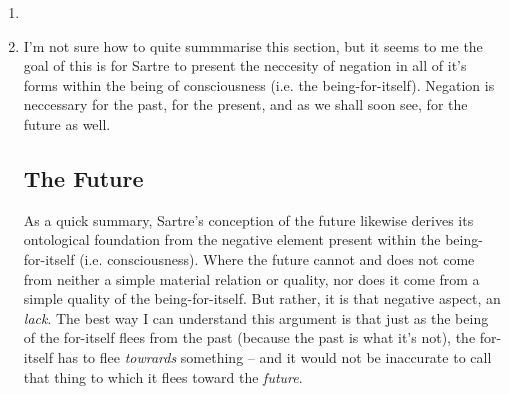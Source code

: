\begin{enumerate}
  \item {}
  \item I'm not sure how to quite summmarise this section, but it seems to me the goal of this is for Sartre to present the neccesity of negation in all of it's forms within the being of consciousness (i.e. the being-for-itself). Negation is neccessary for the past, for the present, and as we shall soon see, for the future as well.

  \subsection*{The Future}
  As a quick summary, Sartre's conception of the future likewise derives its ontological foundation from the negative element present within the being-for-itself (i.e. consciousness). Where the future cannot and does not come from neither a simple material relation or quality, nor does it come from a simple quality of the being-for-itself. But rather, it is that negative aspect, an \emph{lack}. The best way I can understand this argument is that just as the being of the for-itself flees from the past (because the past is what it's not), the for-itself has to flee \emph{towrards} something -- and it would not be inaccurate to call that thing to which it flees toward the \emph{future}.


\end{enumerate}

